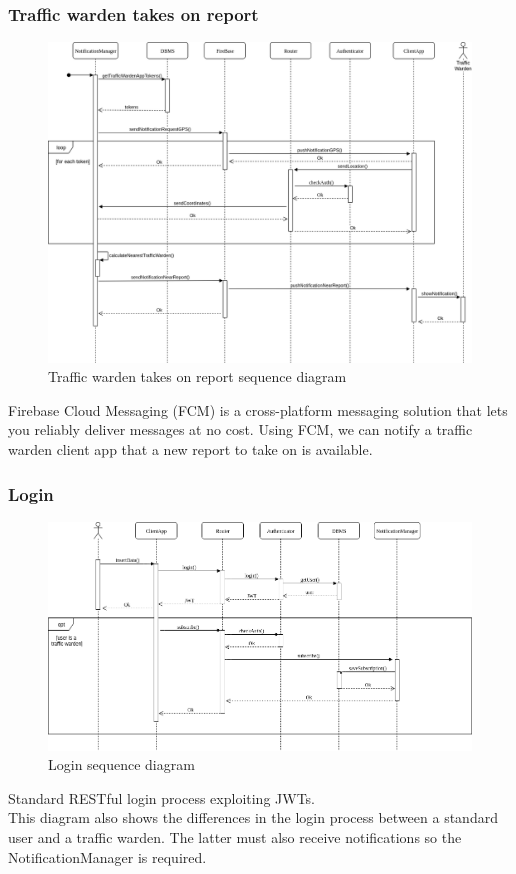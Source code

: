 \documentclass{article}
\begin{document}
\subsubsection{Traffic warden takes on report}
\label{sec:notification}
\begin{figure}[ht]
\centering
	\includegraphics[width=1.0\textwidth]{images/notification-sequence.png}
	\caption{Traffic warden takes on report sequence diagram}
	\label{fig:notifaction-sequence}
\end{figure}
Firebase Cloud Messaging (FCM) is a cross-platform messaging solution that lets you reliably deliver messages at no cost.
Using FCM, we can notify a traffic warden client app that a new report to take on is available.

\newpage
\subsubsection{Login}
\begin{figure}[ht]
\centering
	\includegraphics[width=1.0\textwidth]{images/login-sequence-diagram.png}
	\caption{Login sequence diagram}
	\label{fig:login-sequence-diagram}
\end{figure}
Standard RESTful login process exploiting JWTs. \\
This diagram also shows the differences in the login process between a standard user and a traffic warden. The latter must also receive notifications so the NotificationManager is required.
\end{document}

